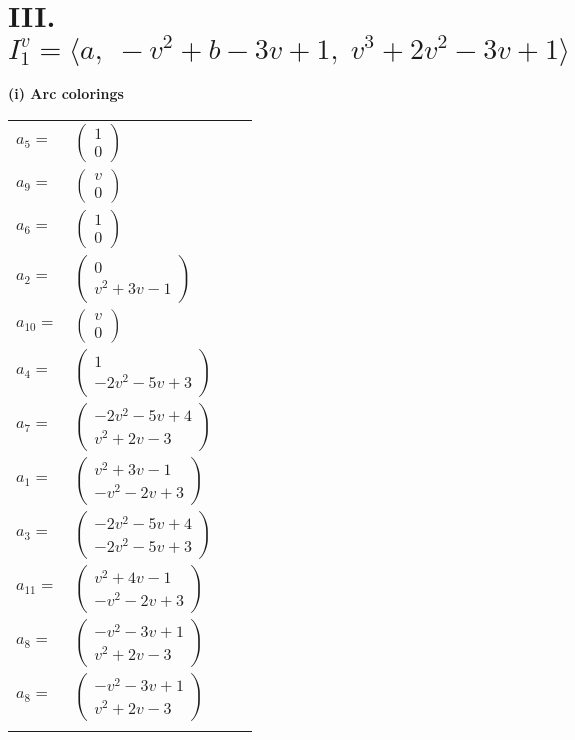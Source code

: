 \documentclass[1p]{elsarticle_modified}
\theoremstyle{definition}
\begin{document}
\centering \section*{III. $I^v_{1}= \langle a,\;- v^2+b-3 v+1,\;v^3+2 v^2-3 v+1 \rangle$}
\flushleft \textbf{(i) Arc colorings}\\
\begin{tabular}{m{7pt} m{180pt} m{7pt} m{180pt} }
\flushright $a_{5}=$&$\begin{pmatrix}1\\0\end{pmatrix}$ \\
\flushright $a_{9}=$&$\begin{pmatrix}v\\0\end{pmatrix}$ \\
\flushright $a_{6}=$&$\begin{pmatrix}1\\0\end{pmatrix}$ \\
\flushright $a_{2}=$&$\begin{pmatrix}0\\v^2+3 v-1\end{pmatrix}$ \\
\flushright $a_{10}=$&$\begin{pmatrix}v\\0\end{pmatrix}$ \\
\flushright $a_{4}=$&$\begin{pmatrix}1\\-2 v^2-5 v+3\end{pmatrix}$ \\
\flushright $a_{7}=$&$\begin{pmatrix}-2 v^2-5 v+4\\v^2+2 v-3\end{pmatrix}$ \\
\flushright $a_{1}=$&$\begin{pmatrix}v^2+3 v-1\\- v^2-2 v+3\end{pmatrix}$ \\
\flushright $a_{3}=$&$\begin{pmatrix}-2 v^2-5 v+4\\-2 v^2-5 v+3\end{pmatrix}$ \\
\flushright $a_{11}=$&$\begin{pmatrix}v^2+4 v-1\\- v^2-2 v+3\end{pmatrix}$ \\
\flushright $a_{8}=$&$\begin{pmatrix}- v^2-3 v+1\\v^2+2 v-3\end{pmatrix}$\\ \flushright $a_{8}=$&$\begin{pmatrix}- v^2-3 v+1\\v^2+2 v-3\end{pmatrix}$\\&\end{tabular}
\end{document}
